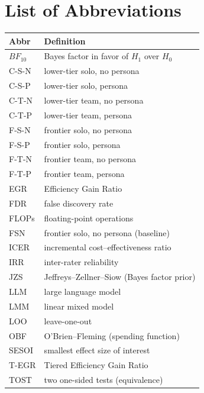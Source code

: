 \documentclass[12pt,a4paper]{article}
\newcommand{\BF}{\ensuremath{\mathit{BF}}}
\begin{document}
\section*{List of Abbreviations}
\small
\begin{longtable}{@{}ll@{}}
\toprule
\textbf{Abbr} & \textbf{Definition} \\
\midrule
$\BF_{10}$        & Bayes factor in favor of $H_1$ over $H_0$ \\
C-S-N             & lower-tier solo, no persona \\
C-S-P             & lower-tier solo, persona \\
C-T-N             & lower-tier team, no persona \\
C-T-P             & lower-tier team, persona \\
F-S-N             & frontier solo, no persona \\
F-S-P             & frontier solo, persona \\
F-T-N             & frontier team, no persona \\
F-T-P             & frontier team, persona \\
EGR               & Efficiency Gain Ratio \\
FDR               & false discovery rate \\
FLOPs             & floating-point operations \\
FSN               & frontier solo, no persona (baseline) \\
ICER              & incremental cost--effectiveness ratio \\
IRR               & inter-rater reliability \\
JZS               & Jeffreys--Zellner--Siow (Bayes factor prior) \\
LLM               & large language model \\
LMM               & linear mixed model \\
LOO               & leave-one-out \\
OBF               & O'Brien--Fleming (spending function) \\
SESOI             & smallest effect size of interest \\
T-EGR             & Tiered Efficiency Gain Ratio \\
TOST              & two one-sided tests (equivalence) \\
\bottomrule
\end{longtable}
\normalsize

\end{document}
